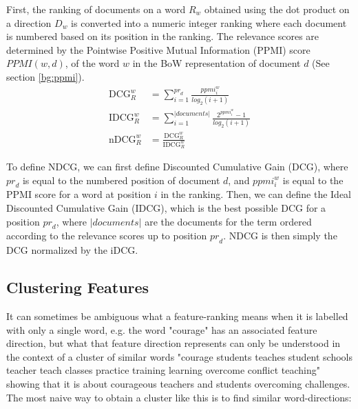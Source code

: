First, the ranking of documents on a word $R_w$ obtained using the dot product on a direction ${D}_w$ is converted into a numeric integer ranking where each document is numbered based on its position in the ranking. The relevance scores are determined by the Pointwise Positive Mutual Information (PPMI) score $\textit{PPMI}(w,d)$, of the word $w$ in the BoW representation of document $d$ (See section \ref{bg:ppmi}). 
\begin{align*}
\text{DCG}_{R}^{w} &= \sum_{i=1}^{{pr}_d}\frac{\textit{ppmi}_{i}^{w}}{log_{2}(i + 1)} \\
\text{IDCG}_{R}^{w} &= \sum^{|\textit{documents}|}_{i=1} \frac{2^{\textit{ppmi}_{i}^{w}}-1}{log_{2}(i + 1)} \\
\text{nDCG}_{R}^{w} &= \frac{\text{DCG}_{R}^{w}}{\text{IDCG}_{R}^{w}}
\end{align*}  

To define NDCG, we can first define Discounted Cumulative Gain (DCG), where ${pr}_{d}$ is equal to the numbered position of document $d$, and $ppmi_{i}^{w}$ is equal to the PPMI score for a word at position $i$ in the ranking. Then, we can define the Ideal Discounted Cumulative Gain (IDCG), which is the best possible DCG for a position ${pr}_{d}$, where $|documents|$ are the documents for the term ordered according to the relevance scores up to position ${pr}_{d}$. NDCG is then simply the DCG normalized by the iDCG.

\subsection{Clustering Features}\label{ch3:LabellingWords}

 It can sometimes be ambiguous what a feature-ranking means when it is labelled with only a single word, e.g. the word "courage" has an associated feature direction, but what that feature direction represents can only be understood in the context of a cluster of similar words "courage students teaches student schools teacher teach classes practice training learning overcome conflict teaching" showing that it is about courageous teachers and students overcoming challenges. The most naive way to obtain a cluster like this is to find similar word-directions: 

